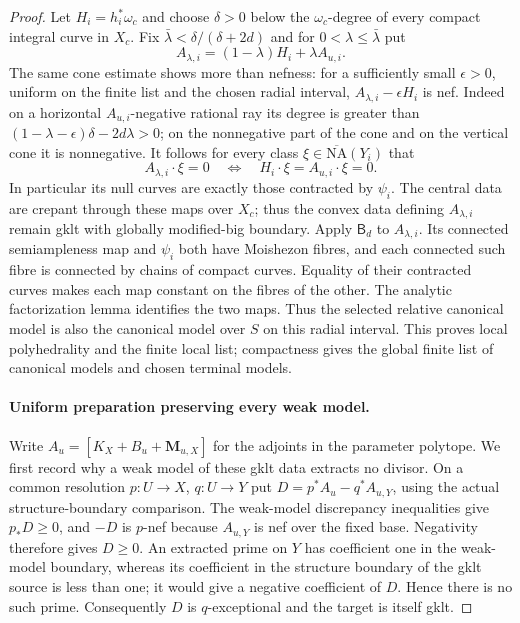 \begin{proof}
Let $H_i=h_i^*\omega_c$ and choose $\delta>0$ below the
$\omega_c$-degree of every compact integral curve in $X_c$. Fix $\bar\lambda<\delta/(\delta+2d)$ and for
$0<\lambda\leq\bar\lambda$ put
\[
 A_{\lambda,i}=(1-\lambda)H_i+\lambda A_{u,i}.
\]
The same cone estimate shows more than nefness: for a sufficiently
small $\epsilon>0$, uniform on the finite list and the chosen radial
interval, $A_{\lambda,i}-\epsilon H_i$ is nef. Indeed on a
horizontal $A_{u,i}$-negative rational ray its degree is greater than
$(1-\lambda-\epsilon)\delta-2d\lambda>0$; on the nonnegative
part of the cone and on the vertical cone it is nonnegative.
It follows for every class $\xi\in\overline{\mathrm{NA}}(Y_i)$ that
\[
 A_{\lambda,i}\cdot\xi=0
 \quad\Longleftrightarrow\quad
 H_i\cdot\xi=A_{u,i}\cdot\xi=0.
\]
In particular its null curves are exactly those contracted by
$\psi_i$. The central data are crepant through these maps over $X_c$;
thus the convex data defining $A_{\lambda,i}$ remain gklt with
globally modified-big boundary. Apply $\mathsf B_d$ to $A_{\lambda,i}$. Its connected
semiampleness map and $\psi_i$ both have Moishezon fibres, and each
connected such fibre is connected by chains of compact curves.
Equality of their contracted curves makes each map constant on the
fibres of the other. The analytic factorization lemma identifies
the two maps. Thus the selected relative canonical model is also
the canonical model over $S$ on this radial interval.
This proves local polyhedrality and the finite local list; compactness
gives the global finite list of canonical models and chosen terminal
models.

\paragraph{Uniform preparation preserving every weak model.}
\label{prog:uniform-preparation}
Write $A_u=[K_X+B_u+\mathbf M_{u,X}]$ for the adjoints in the
parameter polytope. We first record why a weak model of these gklt data
extracts no divisor. On a common resolution $p:U\to X$, $q:U\to Y$
put $D=p^*A_u-q^*A_{u,Y}$, using the actual structure-boundary
comparison. The weak-model discrepancy inequalities give $p_*D\geq0$,
and $-D$ is $p$-nef because $A_{u,Y}$ is nef over the fixed base.
Negativity therefore gives $D\geq0$. An extracted prime on $Y$ has
coefficient one in the weak-model boundary, whereas its coefficient in
the structure boundary of the gklt source is less than one; it would
give a negative coefficient of $D$. Hence there is no such prime.
Consequently $D$ is $q$-exceptional and the target is itself gklt.


\end{proof}
